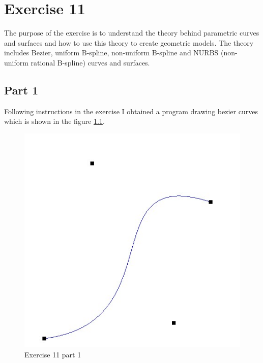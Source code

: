 \chapter{Exercise 11}
The purpose of the exercise is to understand the theory behind
parametric curves and surfaces and how to use this theory to create
geometric models. The theory includes Bezier, uniform B-spline,
non-uniform B-spline and NURBS (non-uniform rational B-spline)
curves and surfaces.

\section{Part 1}
Following instructions in the exercise I obtained a program drawing bezier
curves which is shown in the figure \ref{fig:exercise_11_part_1}.
\begin{figure}[ht!]
	\begin{center}
		\includegraphics[width=.6\textwidth]{figures/exercise_11_part_1}
	\end{center}
	\vspace{-4.5ex}\caption{Exercise 11 part 1}
	\label{fig:exercise_11_part_1} 
\end{figure}

